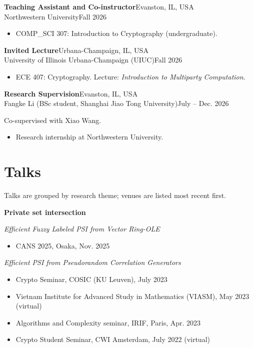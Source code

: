 \documentclass[11pt]{article}
\newcommand{\entry}[4]{%
  \needspace{3\baselineskip}%
  \noindent\textbf{#1}\hspace{1em}\hfill #2\\[0.15em]
  \noindent #3\hspace{1em}\hfill #4\par\vspace{0.45em}}
\begin{document}
\entry{Teaching Assistant and Co-instructor}{Evanston, IL, USA}
{Northwestern University}{Fall 2026}
\vspace{-0.6em}
\begin{itemize}
      \item COMP\_SCI 307: Introduction to Cryptography (undergraduate).
\end{itemize}
\vspace{0.45em}

\entry{Invited Lecture}{Urbana-Champaign, IL, USA}
{University of Illinois Urbana-Champaign (UIUC)}{Fall 2026}
\vspace{-0.6em}
\begin{itemize}
      \item ECE 407: Cryptography. Lecture: \emph{Introduction to Multiparty Computation}.
\end{itemize}
\vspace{0.45em}

\entry{Research Supervision}{Evanston, IL, USA}
{Fangke Li (BSc student, Shanghai Jiao Tong University)}{July -- Dec. 2026}
\vspace{-0.45em}
\noindent Co-supervised with Xiao Wang.\par\vspace{0.45em}
\vspace{-0.6em}
\begin{itemize}
      \item Research internship at Northwestern University.
\end{itemize}

\section{Talks}

Talks are grouped by research theme; venues are listed most recent first.

\smallskip
\textbf{Private set intersection}

\smallskip
\emph{Efficient Fuzzy Labeled PSI from Vector Ring-OLE}
\begin{itemize}
      \item CANS 2025, Osaka, Nov. 2025
\end{itemize}

\smallskip
\emph{Efficient PSI from Pseudorandom Correlation Generators}
\begin{itemize}
      \item Crypto Seminar, COSIC (KU Leuven), July 2023
      \item Vietnam Institute for Advanced Study in Mathematics (VIASM), May 2023 (virtual)
      \item Algorithms and Complexity seminar, IRIF, Paris, Apr. 2023
      \item Crypto Student Seminar, CWI Amsterdam, July 2022 (virtual)
\end{itemize}
\end{document}
